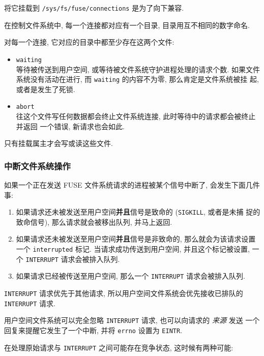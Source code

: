 \documentclass[nofonts, titlepage]{ctexart}
\begin{document}
将它挂载到 \texttt{/sys/fs/fuse/connections} 是为了向下兼容.

在控制文件系统中, 每一个连接都对应有一个目录, 目录用互不相同的数字命名.

对每一个连接, 它对应的目录中都至少存在这两个文件:

\begin{itemize}
\item
  \texttt{waiting}\\等待被传送到用户空间,
  或等待被文件系统守护进程处理的请求个数. 如果文件 系统没有活动在进行,
  而 \texttt{waiting} 的内容不为零, 那么肯定是文件系统被挂 起,
  或者是发生了死锁.
\item
  \texttt{abort}\\往这个文件写任何数据都会终止文件系统连接,
  此时等待中的请求都会被终止并返回 一个错误, 新请求也会如此.
\end{itemize}

只有挂载属主才会写或读这些文件.

\subsubsection{中断文件系统操作}\label{ux4e2dux65adux6587ux4ef6ux7cfbux7edfux64cdux4f5c}

如果一个正在发送 FUSE 文件系统请求的进程被某个信号中断了,
会发生下面几件事:

\begin{enumerate}
\def\labelenumi{\arabic{enumi}.}
\item
  如果请求还未被发送至用户空间\textbf{并且}信号是致命的
  (\texttt{SIGKILL}, 或者是未捕 捉的致命信号), 那么请求就会被移出队列,
  并马上返回.
\item
  如果请求还未被发送至用户空间\textbf{并且}信号是非致命的,
  那么就会为该请求设置 一个 \texttt{interrupted} 标记.
  当请求成功传送到用户空间, 并且这个标记被设置, 一 个 \texttt{INTERRUPT}
  请求会被排入队列.
\item
  如果请求已经被传送至用户空间, 那么一个 \texttt{INTERRUPT}
  请求会被排入队列.
\end{enumerate}

\texttt{INTERRUPT} 请求优先于其他请求,
所以用户空间文件系统会优先接收已排队的 \texttt{INTERRUPT} 请求.

用户空间文件系统可以完全忽略 \texttt{INTERRUPT} 请求, 也可以向请求的
\emph{来源} 发送 一个回复来提醒它发生了一个中断, 并将 \texttt{errno}
设置为 \texttt{EINTR}.

在处理原始请求与 \texttt{INTERRUPT} 之间可能存在竞争状态,
这时候有两种可能:
\end{document}
